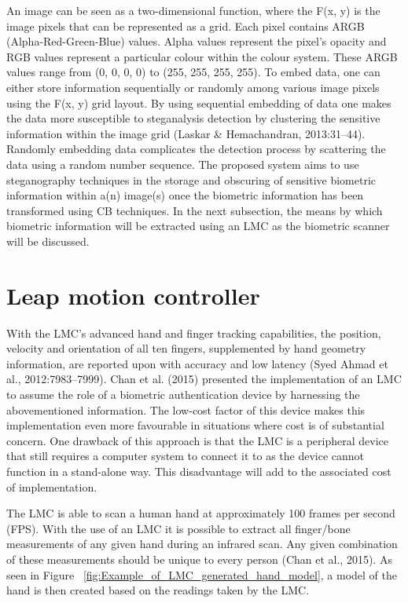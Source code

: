 An image can be seen as a two-dimensional function, where the F(x, y) is the image pixels that can be represented as a grid. Each pixel contains ARGB (Alpha-Red-Green-Blue) values. Alpha values represent the pixel’s opacity and RGB values represent a particular colour within the colour system. These ARGB values range from (0, 0, 0, 0) to (255, 255, 255, 255). To embed data, one can either store information sequentially or randomly among various image pixels using the F(x, y) grid layout. By using sequential embedding of data one makes the data more susceptible to steganalysis detection by clustering the sensitive information within the image grid (Laskar \& Hemachandran, 2013:31–44). Randomly embedding data complicates the detection process by scattering the data using a random number sequence. The proposed system aims to use steganography techniques in the storage and obscuring of sensitive biometric information within a(n) image(s) once the biometric information has been transformed using CB techniques. In the next subsection, the means by which biometric information will be extracted using an LMC as the biometric scanner will be discussed.


\section[Leap motion controller ]{Leap motion controller }

With the LMC’s advanced hand and finger tracking capabilities, the position, velocity and orientation of all ten fingers, supplemented by hand geometry information, are reported upon with accuracy and low latency (Syed Ahmad et al., 2012:7983–7999). Chan et al. (2015)  presented the implementation of an LMC to assume the role of a biometric authentication device by harnessing the abovementioned information. The low-cost factor of this device makes this implementation even more favourable in situations where cost is of substantial concern. One drawback of this approach is that the LMC is a peripheral device that still requires a computer system to connect it to as the device cannot function in a stand-alone way. This disadvantage will add to the associated cost of implementation.

The LMC is able to scan a human hand at approximately 100 frames per second (FPS). With the use of an LMC it is possible to extract all finger/bone measurements of any given hand during an infrared scan. Any given combination of these measurements should be unique to every person (Chan et al., 2015). As seen in Figure ~\ref{fig:Example_of_LMC_generated_hand_model}, a model of the hand is then created based on the readings taken by the LMC.

